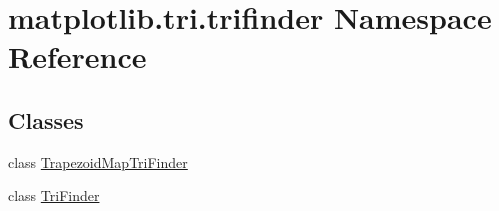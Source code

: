\hypertarget{namespacematplotlib_1_1tri_1_1trifinder}{}\section{matplotlib.\+tri.\+trifinder Namespace Reference}
\label{namespacematplotlib_1_1tri_1_1trifinder}
\subsection*{Classes}
\begin{DoxyCompactItemize}
\item 
class \hyperlink{classmatplotlib_1_1tri_1_1trifinder_1_1TrapezoidMapTriFinder}{Trapezoid\+Map\+Tri\+Finder}
\item 
class \hyperlink{classmatplotlib_1_1tri_1_1trifinder_1_1TriFinder}{Tri\+Finder}
\end{DoxyCompactItemize}
